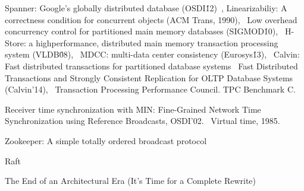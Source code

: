 
\iffalse
\parab{Bounded delay.}A network with bounded delay can improve reordering delay of \sys. Achieving bounded delay requires the queue length to be bounded and the network to be lossless. Recent years see progress in lossless data center networks~\cite{calder2013don,cheng2014catch,handley2017re} and fast detection of packet losses~\cite{li2016lossradar}.
Bounded queuing delay is also enabled by centralized controller~\cite{perry2015fastpass} or end-to-end flow control~\cite{gao2015phost,cho2017credit}.
\fi



\iffalse


Spanner: Google’s globally distributed database (OSDI\'12)~\cite{corbett2013spanner},
Linearizabiliy: A correctness condition for concurrent objects (ACM Trans, 1990),~\cite{herlihy1990linearizability}
Low overhead concurrency control for partitioned main memory databases (SIGMOD\'10),~\cite{jones2010low}
H-Store: a highperformance,
distributed main memory transaction processing
system (VLDB\'08),~\cite{kallman2008h}
MDCC: multi-data center consistency (Eurosys\'13),~\cite{kraska2013mdcc}
Calvin: Fast distributed transactions for
partitioned database systems~\cite{thomson2012calvin}
Fast Distributed Transactions and Strongly Consistent Replication
for OLTP Database Systems (Calvin'14),~\cite{thomson2014fast}
Transaction Processing Performance Council. TPC
Benchmark C.~\cite{council2005transaction}

Receiver time synchronization with MIN:
Fine-Grained Network Time Synchronization using Reference
Broadcasts, OSDI'02.~\cite{elson2002fine}
Virtual time, 1985.~\cite{jefferson1985virtual}


Zookeeper: A simple totally ordered broadcast protocol

Raft

The End of an Architectural Era
(It’s Time for a Complete Rewrite)

